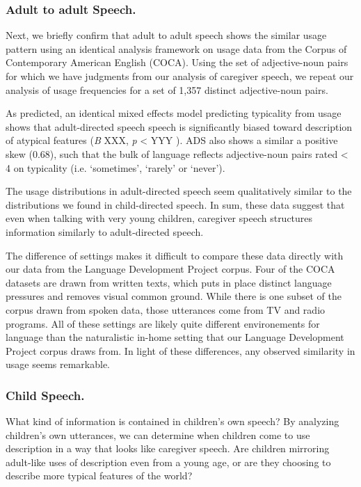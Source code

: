 \documentclass[10pt, letterpaper]{article}
\begin{document}
\hypertarget{adult-to-adult-speech.}{%
\subsubsection{Adult to adult Speech.}\label{adult-to-adult-speech.}}

Next, we briefly confirm that adult to adult speech shows the similar
usage pattern using an identical analysis framework on usage data from
the Corpus of Contemporary American English (COCA). Using the set of
adjective-noun pairs for which we have judgments from our analysis of
caregiver speech, we repeat our analysis of usage frequencies for a set
of 1,357 distinct adjective-noun pairs.

As predicted, an identical mixed effects model predicting typicality
from usage shows that adult-directed speech speech is significantly
biased toward description of atypical features (\emph{B} XXX, \emph{p}
\textless{} YYY ). ADS also shows a similar a positive skew (0.68), such
that the bulk of language reflects adjective-noun pairs rated
\textless{} 4 on typicality (i.e. `sometimes', `rarely' or `never').

The usage distributions in adult-directed speech seem qualitatively
similar to the distributions we found in child-directed speech. In sum,
these data suggest that even when talking with very young children,
caregiver speech structures information similarly to adult-directed
speech.

The difference of settings makes it difficult to compare these data
directly with our data from the Language Development Project corpus.
Four of the COCA datasets are drawn from written texts, which puts in
place distinct language pressures and removes visual common ground.
While there is one subset of the corpus drawn from spoken data, those
utterances come from TV and radio programs. All of these settings are
likely quite different environements for language than the naturalistic
in-home setting that our Language Development Project corpus draws from.
In light of these differences, any observed similarity in usage seems
remarkable.

\hypertarget{child-speech.}{%
\subsubsection{Child Speech.}\label{child-speech.}}

What kind of information is contained in children's own speech? By
analyzing children's own utterances, we can determine when children come
to use description in a way that looks like caregiver speech. Are
children mirroring adult-like uses of description even from a young age,
or are they choosing to describe more typical features of the world?
\end{document}
